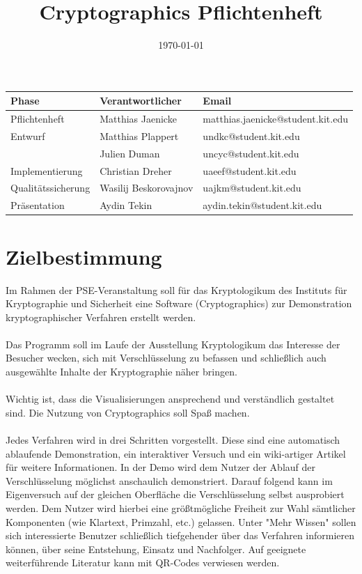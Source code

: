 \documentclass{article}
\title{Cryptographics Pflichtenheft}
\author{}
\date{\today}
\begin{document}
\maketitle
\begin{table}[b]
  \begin{tabular}{| l | l | l |}
    \hline
    \textbf{Phase} & \textbf{Verantwortlicher} & \textbf{Email} \\ \hline
    Pflichtenheft & Matthias Jaenicke & matthias.jaenicke@student.kit.edu \\ \hline
    Entwurf & Matthias Plappert & undkc@student.kit.edu \\
            & Julien Duman & uncyc@student.kit.edu \\ \hline
    Implementierung & Christian Dreher & uaeef@student.kit.edu \\ \hline
    Qualitätssicherung & Wasilij Beskorovajnov & uajkm@student.kit.edu \\ \hline
    Präsentation & Aydin Tekin & aydin.tekin@student.kit.edu \\ \hline
    \end{tabular}
\end{table}
\newpage


\tableofcontents
\newpage

\section{Zielbestimmung}


Im Rahmen der PSE-Veranstaltung soll für das Kryptologikum des Instituts für
Kryptographie und Sicherheit eine Software (Cryptographics) zur
Demonstration kryptographischer Verfahren erstellt werden. \\
\\
Das Programm soll im Laufe der Ausstellung Kryptologikum das Interesse der Besucher wecken, sich mit Verschlüsselung zu befassen und schließlich auch ausgewählte Inhalte der Kryptographie näher bringen. \\
\\
Wichtig ist, dass die Visualisierungen ansprechend und verständlich gestaltet sind. Die Nutzung von Cryptographics soll Spaß machen. \\
\\
Jedes Verfahren wird in drei Schritten vorgestellt. Diese sind eine automatisch ablaufende Demonstration, ein interaktiver Versuch und ein wiki-artiger Artikel für weitere Informationen.
In der Demo wird dem Nutzer der Ablauf der Verschlüsselung möglichst anschaulich demonstriert. Darauf folgend kann im Eigenversuch auf der gleichen Oberfläche die Verschlüsselung selbst ausprobiert werden. Dem Nutzer wird hierbei eine größtmögliche Freiheit zur Wahl sämtlicher Komponenten (wie Klartext, Primzahl, etc.) gelassen. Unter "Mehr Wissen" sollen sich interessierte Benutzer schließlich tiefgehender über das Verfahren informieren können, über seine Entstehung, Einsatz und Nachfolger. Auf geeignete weiterführende Literatur kann mit QR-Codes verwiesen werden. \\
\end{document}
